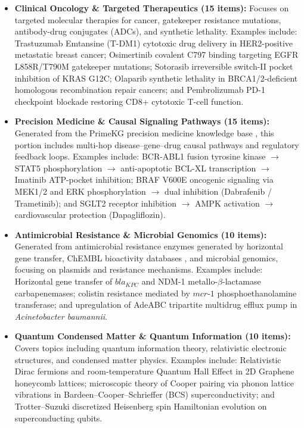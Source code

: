 \documentclass{llncs}
\begin{document}
\begin{itemize}
    \item \textbf{Clinical Oncology \& Targeted Therapeutics (15 items):} Focuses on targeted molecular therapies for cancer, gatekeeper resistance mutations, antibody-drug conjugates (ADCs), and synthetic lethality. Examples include: Trastuzumab Emtansine (T-DM1) cytotoxic drug delivery in HER2-positive metastatic breast cancer; Osimertinib covalent C797 binding targeting EGFR L858R/T790M gatekeeper mutations; Sotorasib irreversible switch-II pocket inhibition of KRAS G12C; Olaparib synthetic lethality in BRCA1/2-deficient homologous recombination repair cancers; and Pembrolizumab PD-1 checkpoint blockade restoring CD8+ cytotoxic T-cell function.
    \item \textbf{Precision Medicine \& Causal Signaling Pathways (15 items):} Generated from the PrimeKG precision medicine knowledge base \cite{chandak2023building}, this portion includes multi-hop disease--gene--drug causal pathways and regulatory feedback loops. Examples include: BCR-ABL1 fusion tyrosine kinase $\rightarrow$ STAT5 phosphorylation $\rightarrow$ anti-apoptotic BCL-XL transcription $\rightarrow$ Imatinib ATP-pocket inhibition; BRAF V600E oncogenic signaling via MEK1/2 and ERK phosphorylation $\rightarrow$ dual inhibition (Dabrafenib / Trametinib); and SGLT2 receptor inhibition $\rightarrow$ AMPK activation $\rightarrow$ cardiovascular protection (Dapagliflozin).
    \item \textbf{Antimicrobial Resistance \& Microbial Genomics (10 items):} Generated from antimicrobial resistance enzymes generated by horizontal gene transfer, ChEMBL bioactivity databases \cite{gaulton2012chembl}, and microbial genomics, focusing on plasmids and resistance mechanisms. Examples include: Horizontal gene transfer of $bla_{KPC}$ and NDM-1 metallo-$\beta$-lactamase carbapenemases; colistin resistance mediated by $mcr\text{-}1$ phosphoethanolamine transferase; and upregulation of AdeABC tripartite multidrug efflux pump in \textit{Acinetobacter baumannii}.
    \item \textbf{Quantum Condensed Matter \& Quantum Information (10 items):} Covers topics including quantum information theory, relativistic electronic structures, and condensed matter physics. Examples include: Relativistic Dirac fermions and room-temperature Quantum Hall Effect in 2D Graphene honeycomb lattices; microscopic theory of Cooper pairing via phonon lattice vibrations in Bardeen--Cooper--Schrieffer (BCS) superconductivity; and Trotter--Suzuki discretized Heisenberg spin Hamiltonian evolution on superconducting qubits.
\end{itemize}
\end{document}
